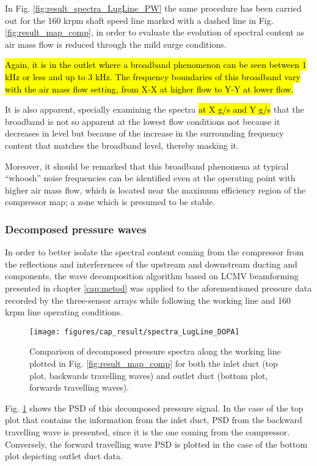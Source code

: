 In Fig. \ref{fig:result_spectra_LugLine_PW} the same procedure has been carried out for the 160 krpm shaft speed line marked with a dashed line in Fig. \ref{fig:result_map_comp}, in order to evaluate the evolution of spectral content as air mass flow is reduced through the mild surge conditions. 

\hl{Again, it is in the outlet where a broadband phenomenon can be seen between 1 kHz or less and up to 3 kHz. The frequency boundaries of this broadband vary with the air mass flow setting, from X-X at higher flow to Y-Y at lower flow.} 

It is also apparent, specially examining the spectra \hl{at X g/s and Y g/s} that the broadband is not so apparent at the lowest flow conditions not because it decreases in level but because of the increase in the surrounding frequency content that matches the broadband level, thereby masking it. 

Moreover, it should be remarked that this broadband phenomena at typical ``whoosh'' noise frequencies can be identified even at the operating point with higher air mass flow, which is located near the maximum efficiency region of the compressor map; a zone which is presumed to be stable.

\subsubsection{Decomposed pressure waves}

In order to better isolate the spectral content coming from the compressor from the reflections and interferences of the upstream and downstream ducting and components, the wave decomposition algorithm based on LCMV beamforming presented in chapter \ref{cap:metod} was applied to the aforementioned pressure data recorded by the three-sensor arrays while following the working line and 160 krpm line operating conditions.

\begin{figure}[tbh!]
\centering
\texttt{[image: figures/cap\_result/spectra\_LugLine\_DOPA]}
\caption{Comparison of decomposed pressure spectra along the working line plotted in Fig. \ref{fig:result_map_comp} for both the inlet duct (top plot, backwards travelling waves) and outlet duct (bottom plot, forwards travelling waves).}
\label{fig:result_spectra_LugLine_DOPA}
\end{figure}

Fig. \ref{fig:result_spectra_LugLine_DOPA} shows the PSD of this decomposed pressure signal. In the case of the top plot that contains the information from the inlet duct, PSD from the backward travelling wave is presented, since it is the one coming from the compressor. Conversely, the forward travelling wave PSD is plotted in the case of the bottom plot depicting outlet duct data.

